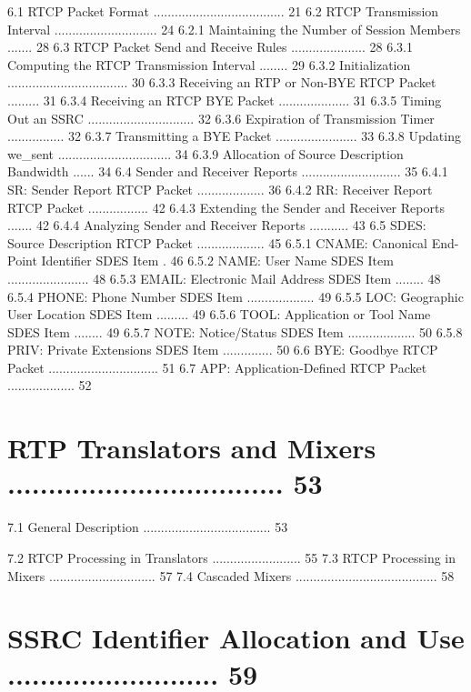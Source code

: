 \documentclass{article}
\begin{document}
6.1  RTCP Packet Format .....................................  21 6.2  RTCP Transmission Interval .............................  24 6.2.1  Maintaining the Number of Session Members .......  28 6.3  RTCP Packet Send and Receive Rules .....................  28 6.3.1  Computing the RTCP Transmission Interval ........  29 6.3.2  Initialization ..................................  30 6.3.3  Receiving an RTP or Non-BYE RTCP Packet .........  31 6.3.4  Receiving an RTCP BYE Packet ....................  31 6.3.5  Timing Out an SSRC ..............................  32 6.3.6  Expiration of Transmission Timer ................  32 6.3.7  Transmitting a BYE Packet .......................  33 6.3.8  Updating we\_sent ................................  34 6.3.9  Allocation of Source Description Bandwidth ......  34 6.4  Sender and Receiver Reports ............................  35 6.4.1  SR: Sender Report RTCP Packet ...................  36 6.4.2  RR: Receiver Report RTCP Packet .................  42 6.4.3  Extending the Sender and Receiver Reports .......  42 6.4.4  Analyzing Sender and Receiver Reports ...........  43 6.5  SDES: Source Description RTCP Packet ...................  45 6.5.1  CNAME: Canonical End-Point Identifier SDES Item .  46 6.5.2  NAME: User Name SDES Item .......................  48 6.5.3  EMAIL: Electronic Mail Address SDES Item ........  48 6.5.4  PHONE: Phone Number SDES Item ...................  49 6.5.5  LOC: Geographic User Location SDES Item .........  49 6.5.6  TOOL: Application or Tool Name SDES Item ........  49 6.5.7  NOTE: Notice/Status SDES Item ...................  50 6.5.8  PRIV: Private Extensions SDES Item ..............  50 6.6  BYE: Goodbye RTCP Packet ...............................  51 6.7  APP: Application-Defined RTCP Packet ...................  52

\section{RTP Translators and Mixers ..................................  53}

7.1  General Description ....................................  53

7.2  RTCP Processing in Translators .........................  55 7.3  RTCP Processing in Mixers ..............................  57 7.4  Cascaded Mixers ........................................  58

\section{SSRC Identifier Allocation and Use ..........................  59}
\end{document}
